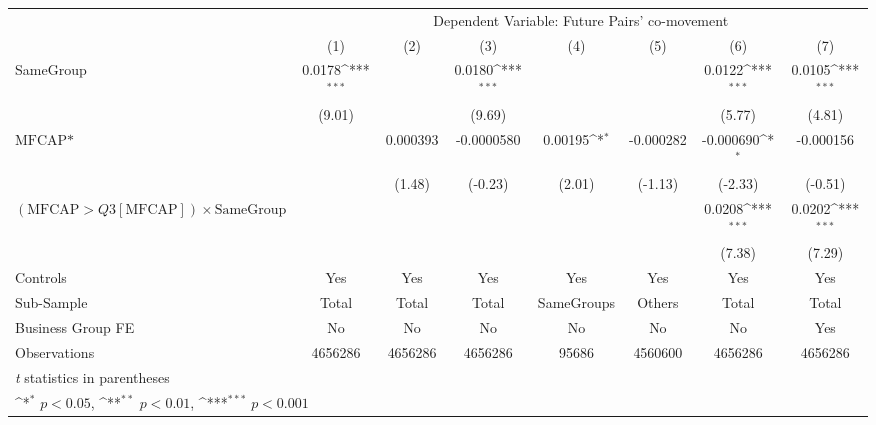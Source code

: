 {
\def\sym#1{\ifmmode^{#1}\else\(^{#1}\)\fi}
\begin{tabular}{l*{7}{c}}
\hline\hline
                &\multicolumn{7}{c}{Dependent Variable: Future Pairs' co-movement}                                                                   \\\cmidrule(lr){2-8}
                &\multicolumn{1}{c}{(1)}         &\multicolumn{1}{c}{(2)}         &\multicolumn{1}{c}{(3)}         &\multicolumn{1}{c}{(4)}         &\multicolumn{1}{c}{(5)}         &\multicolumn{1}{c}{(6)}         &\multicolumn{1}{c}{(7)}         \\
\hline
SameGroup       &   0.0178\sym{***}&                  &   0.0180\sym{***}&                  &                  &   0.0122\sym{***}&   0.0105\sym{***}\\
                &   (9.01)         &                  &   (9.69)         &                  &                  &   (5.77)         &   (4.81)         \\
[1em]
$ \text{MFCAP*} $&                  & 0.000393         &-0.0000580         &  0.00195\sym{*}  &-0.000282         &-0.000690\sym{*}  &-0.000156         \\
                &                  &   (1.48)         &  (-0.23)         &   (2.01)         &  (-1.13)         &  (-2.33)         &  (-0.51)         \\
[1em]
 $ (\text{MFCAP} > Q3[\text{MFCAP}]) \times  {\text{SameGroup} }  $ &                  &                  &                  &                  &                  &   0.0208\sym{***}&   0.0202\sym{***}\\
                &                  &                  &                  &                  &                  &   (7.38)         &   (7.29)         \\
\hline
Controls        &      Yes         &      Yes         &      Yes         &      Yes         &      Yes         &      Yes         &      Yes         \\
Sub-Sample      &    Total         &    Total         &    Total         &SameGroups         &   Others         &    Total         &    Total         \\
Business Group FE&       No         &       No         &       No         &       No         &       No         &       No         &      Yes         \\
Observations    &  4656286         &  4656286         &  4656286         &    95686         &  4560600         &  4656286         &  4656286         \\
\hline\hline
\multicolumn{8}{l}{\footnotesize \textit{t} statistics in parentheses}\\
\multicolumn{8}{l}{\footnotesize \sym{*} \(p<0.05\), \sym{**} \(p<0.01\), \sym{***} \(p<0.001\)}\\
\end{tabular}
}
